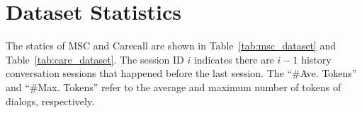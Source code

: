 \documentclass[authoryear,preprint,review,12pt]{elsarticle}
\begin{document}
\section{Dataset Statistics}
\label{ap:dataset}
The statics of MSC and Carecall are shown in Table~\ref{tab:msc_dataset} and Table~\ref{tab:care_dataset}. The session ID $i$ indicates there are $i-1$ history conversation sessions that happened before the last session. The ``\#Ave. Tokens'' and ``\#Max. Tokens''  refer to the average and maximum number of tokens of dialogs, respectively.
\begin{table}[htbp]
\centering
\caption{\textbf{The statistics of MSC Dataset}.}
\label{tab:msc_dataset}
\end{table}

\begin{table}[htbp]
\centering
\caption{\textbf{The statistics of Carecall Dataset}.}
\label{tab:care_dataset}
\end{table}
\end{document}
